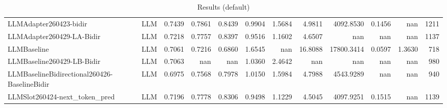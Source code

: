 \begin{table}[htbp]
{\begin{tabular}{ll|rrrrrrrrr|r}
LLMAdapter260423-bidir & LLM & 0.7439 & 0.7861 & 0.8439 & 0.9904 & 1.5684 & 4.9811 & 4092.8530 & 0.1456 & nan & 1211 \\
LLMAdapter260429-LA-Bidir & LLM & 0.7218 & 0.7757 & 0.8397 & 0.9516 & 1.1602 & 4.6507 & nan & nan & nan & 1137 \\
LLMBaseline & LLM & 0.7061 & 0.7216 & 0.6860 & 1.6545 & nan & 16.8088 & 17800.3414 & 0.0597 & 1.3630 & 718 \\
LLMBaseline260429-LB-Bidir & LLM & 0.7063 & nan & nan & 1.0360 & 2.4642 & nan & nan & nan & nan & 980 \\
LLMBaselineBidirectional260426-BaselineBidir & LLM & 0.6975 & 0.7568 & 0.7978 & 1.0150 & 1.5984 & 4.7988 & 4543.9289 & nan & nan & 940 \\
LLMSlot260424-next\_token\_pred & LLM & 0.7196 & 0.7778 & 0.8306 & 0.9498 & 1.1229 & 4.5045 & 4097.9251 & 0.1515 & nan & 1139 \\
\bottomrule
\end{tabular}
}
\caption{Results (default)}
\label{tab:results_default}
\end{table}
